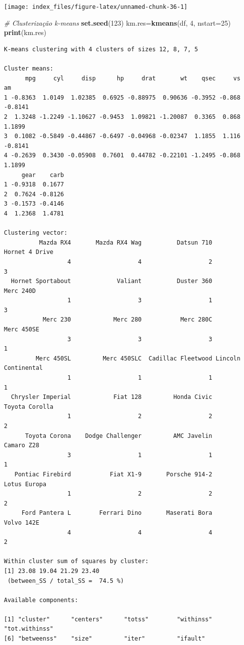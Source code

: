 \documentclass[12pt,brazil,oneside]{book}
\newenvironment{Shaded}{\begin{snugshade}}{\end{snugshade}}
\newcommand{\CommentTok}[1]{\textcolor[rgb]{0.56,0.35,0.01}{\textit{#1}}}
\newcommand{\DataTypeTok}[1]{\textcolor[rgb]{0.13,0.29,0.53}{#1}}
\newcommand{\DecValTok}[1]{\textcolor[rgb]{0.00,0.00,0.81}{#1}}
\newcommand{\KeywordTok}[1]{\textcolor[rgb]{0.13,0.29,0.53}{\textbf{#1}}}
\newcommand{\NormalTok}[1]{#1}
\begin{document}
\begin{center}\texttt{[image: index\_files/figure-latex/unnamed-chunk-36-1]} \end{center}

\begin{Shaded}
\begin{Highlighting}[]
\CommentTok{# Clusterização k-means}
\KeywordTok{set.seed}\NormalTok{(}\DecValTok{123}\NormalTok{)}
\NormalTok{km.res=}\KeywordTok{kmeans}\NormalTok{(df, }\DecValTok{4}\NormalTok{, }\DataTypeTok{nstart=}\DecValTok{25}\NormalTok{)}
\KeywordTok{print}\NormalTok{(km.res)}
\end{Highlighting}
\end{Shaded}

\begin{verbatim}
K-means clustering with 4 clusters of sizes 12, 8, 7, 5

Cluster means:
      mpg     cyl     disp      hp     drat       wt    qsec     vs      am
1 -0.8363  1.0149  1.02385  0.6925 -0.88975  0.90636 -0.3952 -0.868 -0.8141
2  1.3248 -1.2249 -1.10627 -0.9453  1.09821 -1.20087  0.3365  0.868  1.1899
3  0.1082 -0.5849 -0.44867 -0.6497 -0.04968 -0.02347  1.1855  1.116 -0.8141
4 -0.2639  0.3430 -0.05908  0.7601  0.44782 -0.22101 -1.2495 -0.868  1.1899
     gear    carb
1 -0.9318  0.1677
2  0.7624 -0.8126
3 -0.1573 -0.4146
4  1.2368  1.4781

Clustering vector:
          Mazda RX4       Mazda RX4 Wag          Datsun 710      Hornet 4 Drive 
                  4                   4                   2                   3 
  Hornet Sportabout             Valiant          Duster 360           Merc 240D 
                  1                   3                   1                   3 
           Merc 230            Merc 280           Merc 280C          Merc 450SE 
                  3                   3                   3                   1 
         Merc 450SL         Merc 450SLC  Cadillac Fleetwood Lincoln Continental 
                  1                   1                   1                   1 
  Chrysler Imperial            Fiat 128         Honda Civic      Toyota Corolla 
                  1                   2                   2                   2 
      Toyota Corona    Dodge Challenger         AMC Javelin          Camaro Z28 
                  3                   1                   1                   1 
   Pontiac Firebird           Fiat X1-9       Porsche 914-2        Lotus Europa 
                  1                   2                   2                   2 
     Ford Pantera L        Ferrari Dino       Maserati Bora          Volvo 142E 
                  4                   4                   4                   2 

Within cluster sum of squares by cluster:
[1] 23.08 19.04 21.29 23.40
 (between_SS / total_SS =  74.5 %)

Available components:

[1] "cluster"      "centers"      "totss"        "withinss"     "tot.withinss"
[6] "betweenss"    "size"         "iter"         "ifault"      
\end{verbatim}
\end{document}
